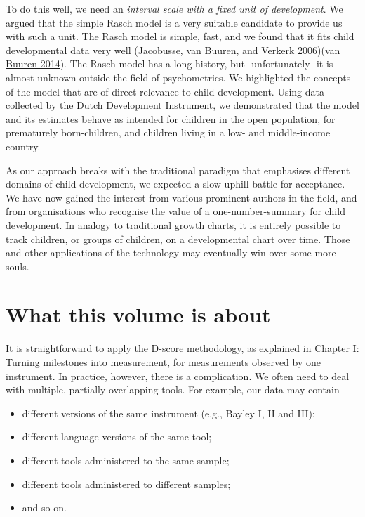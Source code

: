 \documentclass[
]{book}
\providecommand{\tightlist}{%
  \setlength{\itemsep}{0pt}\setlength{\parskip}{0pt}}
\begin{document}
To do this well, we need an \emph{interval scale with a fixed unit of development}. We argued that the simple Rasch model is a very suitable candidate to provide us with such a unit. The Rasch model is simple, fast, and we found that it fits child developmental data very well (\protect\hyperlink{ref-jacobusse2006}{Jacobusse, van Buuren, and Verkerk 2006})(\protect\hyperlink{ref-vanbuuren2014}{van Buuren 2014}). The Rasch model has a long history, but -unfortunately- it is almost unknown outside the field of psychometrics. We highlighted the concepts of the model that are of direct relevance to child development. Using data collected by the Dutch Development Instrument, we demonstrated that the model and its estimates behave as intended for children in the open population, for prematurely born-children, and children living in a low- and middle-income country.

As our approach breaks with the traditional paradigm that emphasises different domains of child development, we expected a slow uphill battle for acceptance. We have now gained the interest from various prominent authors in the field, and from organisations who recognise the value of a one-number-summary for child development. In analogy to traditional growth charts, it is entirely possible to track children, or groups of children, on a developmental chart over time. Those and other applications of the technology may eventually win over some more souls.

\hypertarget{sec:thisvolume}{%
\section{What this volume is about}\label{sec:thisvolume}}

It is straightforward to apply the D-score methodology, as explained in \href{https://d-score.org/dbook1}{Chapter I: Turning milestones into measurement}, for measurements observed by one instrument. In practice, however, there is a complication. We often need to deal with multiple, partially overlapping tools. For example, our data may contain

\begin{itemize}
\tightlist
\item
  different versions of the same instrument (e.g., Bayley I, II and III);
\item
  different language versions of the same tool;
\item
  different tools administered to the same sample;
\item
  different tools administered to different samples;
\item
  and so on.
\end{itemize}
\end{document}
